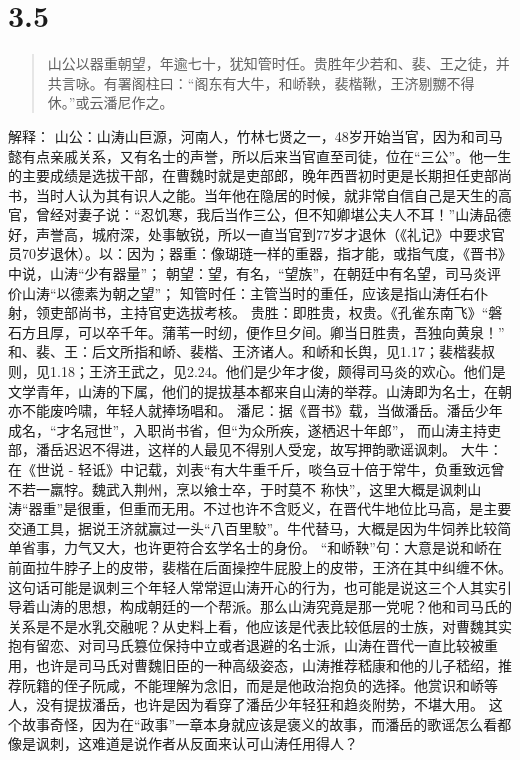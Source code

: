 \documentclass[]{book}
\begin{document}
\section{3.5}\label{section-159}

\begin{quote}
山公以器重朝望，年逾七十，犹知管时任。贵胜年少若和、裴、王之徒，并共言咏。有署阁柱曰：``阁东有大牛，和峤鞅，裴楷鞦，王济剔嬲不得休。''或云潘尼作之。
\end{quote}

解释：
山公：山涛山巨源，河南人，竹林七贤之一，48岁开始当官，因为和司马懿有点亲戚关系，又有名士的声誉，所以后来当官直至司徒，位在``三公''。他一生的主要成绩是选拔干部，在曹魏时就是吏部郎，晚年西晋初时更是长期担任吏部尚书，当时人认为其有识人之能。当年他在隐居的时候，就非常自信自己是天生的高官，曾经对妻子说：``忍饥寒，我后当作三公，但不知卿堪公夫人不耳！''山涛品德好，声誉高，城府深，处事敏锐，所以一直当官到77岁才退休（《礼记》中要求官员70岁退休）。以：因为；器重：像瑚琏一样的重器，指才能，或指气度，《晋书》中说，山涛``少有器量''；
朝望：望，有名，``望族''，在朝廷中有名望，司马炎评价山涛``以德素为朝之望''；
知管时任：主管当时的重任，应该是指山涛任右仆射，领吏部尚书，主持官吏选拔考核。
贵胜：即胜贵，权贵。《孔雀东南飞》``磐石方且厚，可以卒千年。蒲苇一时纫，便作旦夕间。卿当日胜贵，吾独向黄泉！''
和、裴、王：后文所指和峤、裴楷、王济诸人。和峤和长舆，见1.17；裴楷裴叔则，见1.18；王济王武之，见2.24。他们是少年才俊，颇得司马炎的欢心。他们是文学青年，山涛的下属，他们的提拔基本都来自山涛的举荐。山涛即为名士，在朝亦不能废吟啸，年轻人就捧场唱和。
潘尼：据《晋书》载，当做潘岳。潘岳少年成名，``才名冠世''，入职尚书省，但``为众所疾，遂栖迟十年郎''，
而山涛主持吏部，潘岳迟迟不得进，这样的人最见不得别人受宠，故写押韵歌谣讽刺。
大牛：在《世说 -
轻诋》中记载，刘表``有大牛重千斤，啖刍豆十倍于常牛，负重致远曾不若一羸牸。魏武入荆州，烹以飨士卒，于时莫不
称快''，这里大概是讽刺山涛``器重''是很重，但重而无用。不过也许不含贬义，在晋代牛地位比马高，是主要交通工具，据说王济就赢过一头``八百里駮''。牛代替马，大概是因为牛饲养比较简单省事，力气又大，也许更符合玄学名士的身份。
``和峤鞅''句：大意是说和峤在前面拉牛脖子上的皮带，裴楷在后面操控牛屁股上的皮带，王济在其中纠缠不休。这句话可能是讽刺三个年轻人常常逗山涛开心的行为，也可能是说这三个人其实引导着山涛的思想，构成朝廷的一个帮派。那么山涛究竟是那一党呢？他和司马氏的关系是不是水乳交融呢？从史料上看，他应该是代表比较低层的士族，对曹魏其实抱有留恋、对司马氏篡位保持中立或者退避的名士派，山涛在晋代一直比较被重用，也许是司马氏对曹魏旧臣的一种高级姿态，山涛推荐嵇康和他的儿子嵇绍，推荐阮籍的侄子阮咸，不能理解为念旧，而是是他政治抱负的选择。他赏识和峤等人，没有提拔潘岳，也许是因为看穿了潘岳少年轻狂和趋炎附势，不堪大用。
这个故事奇怪，因为在``政事''一章本身就应该是褒义的故事，而潘岳的歌谣怎么看都像是讽刺，这难道是说作者从反面来认可山涛任用得人？
\end{document}
